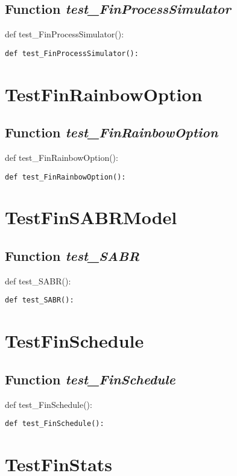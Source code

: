 \documentclass[twoside,11pt]{book}
\begin{document}
\subsection{Function {\it test\_FinProcessSimulator}}
def test\_FinProcessSimulator():

\begin{lstlisting}
def test_FinProcessSimulator():
\end{lstlisting}


\newpage
\section{TestFinRainbowOption}

\subsection{Function {\it test\_FinRainbowOption}}
def test\_FinRainbowOption():

\begin{lstlisting}
def test_FinRainbowOption():
\end{lstlisting}


\newpage
\section{TestFinSABRModel}

\subsection{Function {\it test\_SABR}}
def test\_SABR():

\begin{lstlisting}
def test_SABR():
\end{lstlisting}


\newpage
\section{TestFinSchedule}

\subsection{Function {\it test\_FinSchedule}}
def test\_FinSchedule():

\begin{lstlisting}
def test_FinSchedule():
\end{lstlisting}


\newpage
\section{TestFinStats}
\end{document}
